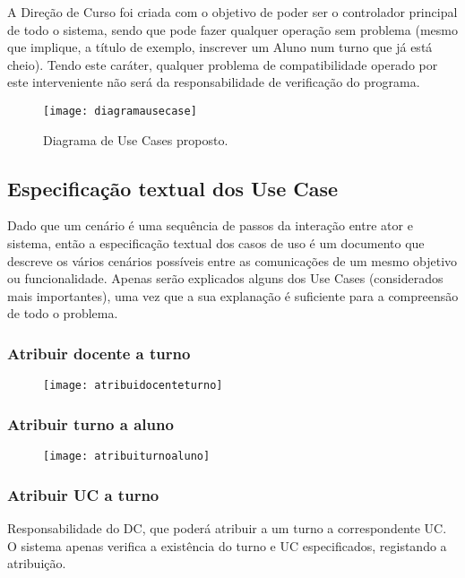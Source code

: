 \documentclass[a4paper]{article}
\begin{document}
A Direção de Curso foi criada com o objetivo de poder ser o controlador principal de todo o sistema, sendo que pode fazer qualquer operação sem problema (mesmo que implique, a título de exemplo, inscrever um Aluno num turno que já está cheio). Tendo este caráter, qualquer problema de compatibilidade operado por este interveniente não será da responsabilidade de verificação do programa.


\begin{figure}[h!]
\centering
\texttt{[image: diagramausecase]}
\caption{Diagrama de Use Cases proposto.}
\label{fig:2}
\end{figure}




\subsection{Especificação textual dos Use Case}
\hspace{3mm}Dado que um cenário é uma sequência de passos da interação entre ator e sistema, então a especificação textual dos casos de uso é um documento que descreve os vários cenários possíveis entre as comunicações de um mesmo objetivo ou funcionalidade. Apenas serão explicados alguns dos Use Cases (considerados mais importantes), uma vez que a sua explanação é suficiente para a compreensão de todo o problema.

\subsubsection{Atribuir docente a turno}

\begin{figure}[H]
\centering
\texttt{[image: atribuidocenteturno]}
\caption{}
\label{fig:3}
\end{figure}


\subsubsection{Atribuir turno a aluno}

\begin{figure}[H]
\centering
\texttt{[image: atribuiturnoaluno]}
\caption{}
\label{fig:4}
\end{figure}


\subsubsection{Atribuir UC a turno}
\hspace{3mm}Responsabilidade do DC, que poderá atribuir a um turno a correspondente UC. O sistema apenas verifica a existência do turno e UC especificados, registando a atribuição.
\end{document}
